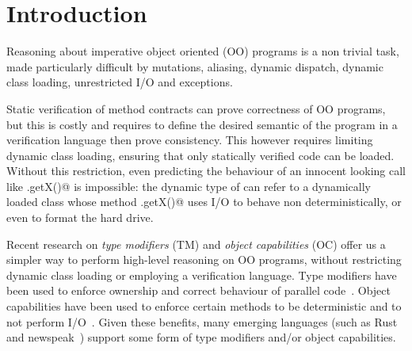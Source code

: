 
\section{Introduction}
\saveSpace\saveSpace

Reasoning about imperative object oriented (OO) programs is a non trivial task,
made particularly difficult by mutations, aliasing, dynamic dispatch, dynamic class loading,
unrestricted I/O and exceptions.

Static verification of method contracts can prove correctness of OO programs, but this is costly and requires to define the desired semantic of the program in a verification language then prove consistency.
This however requires limiting dynamic class loading, ensuring that only statically verified code can be loaded.
Without this restriction, even predicting the behaviour of an innocent looking call like 
\Q@myPoint.getX()@ is impossible: the dynamic type of \Q@myPoint@ can refer to a dynamically loaded class
whose method \Q@.getX()@ uses I/O to behave non deterministically, or even to format the hard drive.

Recent research on \emph{type modifiers} (TM) and \emph{object capabilities} (OC) offer us a simpler way to perform high-level reasoning on OO programs, without restricting dynamic class loading or employing a verification language.
Type modifiers have been used to enforce ownership and  correct behaviour of parallel code~\cite{GordonEtAl12,clebsch2015deny,clebsch2017orca}. Object capabilities have been used to enforce certain methods to be deterministic and to not perform I/O~\cite{finifter2008verifiable}.
Given these benefits, many emerging languages (such as Rust~\cite{matsakis2014rust} and newspeak~\cite{bracha2010modules})
support some form of type modifiers and/or object capabilities.

